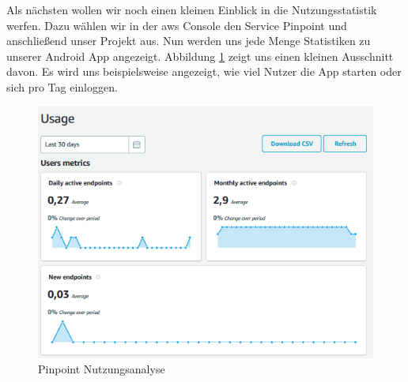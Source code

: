 Als nächsten wollen wir noch einen kleinen Einblick in die Nutzungsstatistik werfen. Dazu wählen wir in der \gls{aws} Console den Service Pinpoint und anschließend unser Projekt aus. Nun werden uns jede Menge Statistiken zu unserer Android App angezeigt. Abbildung \ref{fig:pinpointanalystics} zeigt uns einen kleinen Ausschnitt davon. Es wird uns beispielsweise angezeigt, wie viel Nutzer die App starten oder sich pro Tag einloggen.

\begin{figure}[h!]
	\centering
	\includegraphics[width=1\linewidth]{Pictures/PinpointAnalystics}
	\caption[Pinpoint Nutzungsanalyse]{Pinpoint Nutzungsanalyse}
	\label{fig:pinpointanalystics}
\end{figure}
